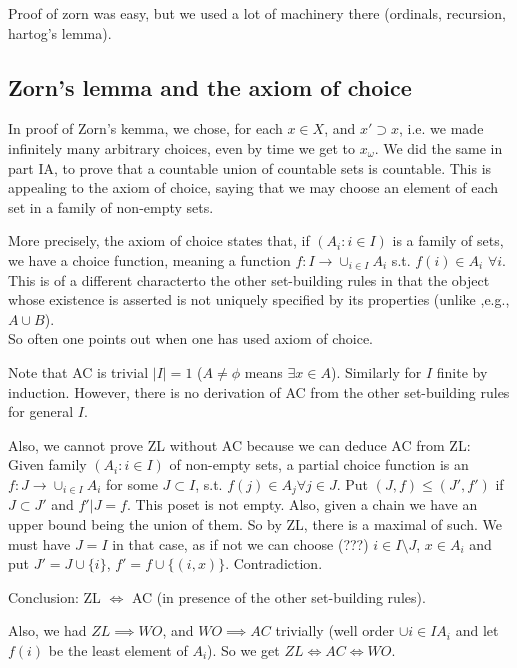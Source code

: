 \documentclass[a4paper]{article}
\begin{document}
\begin{rem}
Proof of zorn was easy, but we used a lot of machinery there (ordinals, recursion, hartog's lemma).
\end{rem}

\subsection{Zorn's lemma and the axiom of choice}
In proof of Zorn's kemma, we chose, for each $x \in X$, and $x' \supset x$, i.e. we made infinitely many arbitrary choices, even by time we get to $x_\omega$. We did the same in part IA, to prove that a countable union of countable sets is countable. This is appealing to the axiom of choice, saying that we may choose an element of each set in a family of non-empty sets.

More precisely, the axiom of choice states that, if $(A_i : i \in I)$ is a family of sets, we have a choice function, meaning a function $f:I \to \cup_{i \in I} A_i$ s.t. $f(i) \in A_i$ $\forall i$. This is of a different characterto the other set-building rules in that the object whose existence is asserted is not uniquely specified by its properties (unlike ,e.g., $A \cup B$).\\
So often one points out when one has used axiom of choice.

Note that AC is trivial $|I| = 1$ ($A \neq \phi$ means $\exists x \in A$). Similarly for $I$ finite by induction. However, there is no derivation of AC from the other set-building rules for general $I$.

Also, we cannot prove ZL without AC because we can deduce AC from ZL:\\
Given family $(A_i:i \in I)$ of non-empty sets, a partial choice function is an $f:J \to \cup_{i \in I} A_i$ for some $J \subset I$, s.t. $f(j) \in A_j \forall j \in J$. Put $(J,f) \leq (J',f')$ if $J \subset J'$ and $f'|J = f$. This poset is not empty. Also, given a chain we have an upper bound being the union of them. So by ZL, there is a maximal of such. We must have $J=I$ in that case, as if not we can choose (???) $i \in I \setminus J$, $x \in A_i$ and put $J' = J \cup \{i\}$, $f' = f \cup \{(i,x)\}$. Contradiction.

Conclusion: ZL $\iff$ AC (in presence of the other set-building rules).

Also, we had $ZL \implies WO$, and $WO \implies AC$ trivially (well order $\cup i \in I A_i$ and let $f(i)$ be the least element of $A_i$). So we get $ZL \iff AC \iff WO$.
\end{document}
